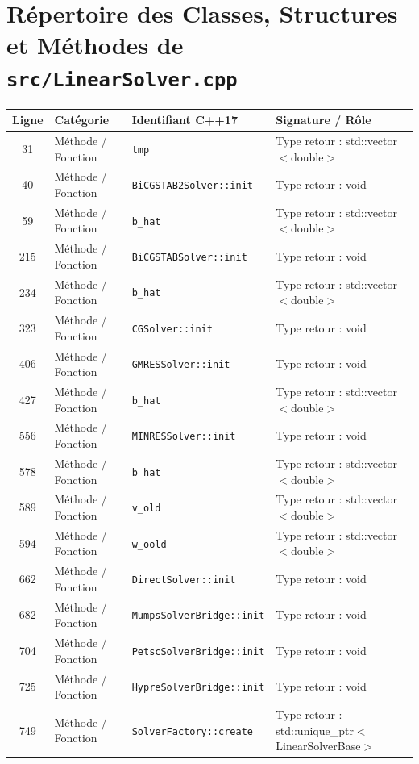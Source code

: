 \documentclass[10pt,a4paper,oneside]{book}
\begin{document}
\section{Répertoire des Classes, Structures et Méthodes de \texttt{src/LinearSolver.cpp}}
\begin{center}\small
\begin{tabular}{clll}
\toprule
\textbf{Ligne} & \textbf{Catégorie} & \textbf{Identifiant C++17} & \textbf{Signature / Rôle} \\
\midrule
31 & Méthode / Fonction & \texttt{tmp} & Type retour : std::vector$<$double$>$ \\
40 & Méthode / Fonction & \texttt{BiCGSTAB2Solver::init} & Type retour : void \\
59 & Méthode / Fonction & \texttt{b\_hat} & Type retour : std::vector$<$double$>$ \\
215 & Méthode / Fonction & \texttt{BiCGSTABSolver::init} & Type retour : void \\
234 & Méthode / Fonction & \texttt{b\_hat} & Type retour : std::vector$<$double$>$ \\
323 & Méthode / Fonction & \texttt{CGSolver::init} & Type retour : void \\
406 & Méthode / Fonction & \texttt{GMRESSolver::init} & Type retour : void \\
427 & Méthode / Fonction & \texttt{b\_hat} & Type retour : std::vector$<$double$>$ \\
556 & Méthode / Fonction & \texttt{MINRESSolver::init} & Type retour : void \\
578 & Méthode / Fonction & \texttt{b\_hat} & Type retour : std::vector$<$double$>$ \\
589 & Méthode / Fonction & \texttt{v\_old} & Type retour : std::vector$<$double$>$ \\
594 & Méthode / Fonction & \texttt{w\_oold} & Type retour : std::vector$<$double$>$ \\
662 & Méthode / Fonction & \texttt{DirectSolver::init} & Type retour : void \\
682 & Méthode / Fonction & \texttt{MumpsSolverBridge::init} & Type retour : void \\
704 & Méthode / Fonction & \texttt{PetscSolverBridge::init} & Type retour : void \\
725 & Méthode / Fonction & \texttt{HypreSolverBridge::init} & Type retour : void \\
749 & Méthode / Fonction & \texttt{SolverFactory::create} & Type retour : std::unique\_ptr$<$LinearSolverBase$>$ \\
\bottomrule
\end{tabular}
\end{center}
\end{document}
